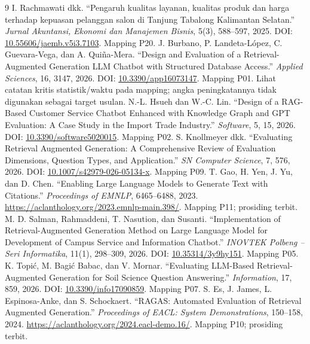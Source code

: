 \documentclass[11pt,a4paper]{article}
\begin{document}
\clearpage
\renewcommand{\refname}{Referensi Utama}
\begin{thebibliography}{9}
\setlength{\itemsep}{8pt}
 I. Rachmawati dkk. ``Pengaruh kualitas layanan, kualitas produk dan harga terhadap kepuasan pelanggan salon di Tanjung Tabalong Kalimantan Selatan.'' \textit{Jurnal Akuntansi, Ekonomi dan Manajemen Bisnis}, 5(3), 588--597, 2025. DOI: \href{https://doi.org/10.55606/jaemb.v5i3.7103}{10.55606/jaemb.v5i3.7103}. Mapping P20.
 J. Burbano, P. Landeta-L\'opez, C. Guevara-Vega, dan A. Qui\~na-Mera. ``Design and Evaluation of a Retrieval-Augmented Generation LLM Chatbot with Structured Database Access.'' \textit{Applied Sciences}, 16, 3147, 2026. DOI: \href{https://doi.org/10.3390/app16073147}{10.3390/app16073147}. Mapping P01. Lihat catatan kritis statistik/waktu pada mapping; angka peningkatannya tidak digunakan sebagai target usulan.
 N.-L. Hsueh dan W.-C. Lin. ``Design of a RAG-Based Customer Service Chatbot Enhanced with Knowledge Graph and GPT Evaluation: A Case Study in the Import Trade Industry.'' \textit{Software}, 5, 15, 2026. DOI: \href{https://doi.org/10.3390/software5020015}{10.3390/software5020015}. Mapping P02.
 S. Knollmeyer dkk. ``Evaluating Retrieval Augmented Generation: A Comprehensive Review of Evaluation Dimensions, Question Types, and Application.'' \textit{SN Computer Science}, 7, 576, 2026. DOI: \href{https://doi.org/10.1007/s42979-026-05134-x}{10.1007/s42979-026-05134-x}. Mapping P09.
 T. Gao, H. Yen, J. Yu, dan D. Chen. ``Enabling Large Language Models to Generate Text with Citations.'' \textit{Proceedings of EMNLP}, 6465--6488, 2023. \url{https://aclanthology.org/2023.emnlp-main.398/}. Mapping P11; prosiding terbit.
 M. D. Salman, Rahmaddeni, T. Nasution, dan Susanti. ``Implementation of Retrieval-Augmented Generation Method on Large Language Model for Development of Campus Service and Information Chatbot.'' \textit{INOVTEK Polbeng -- Seri Informatika}, 11(1), 298--309, 2026. DOI: \href{https://doi.org/10.35314/3y9hy151}{10.35314/3y9hy151}. Mapping P05.
 K. Topi\'c, M. Bagi\'c Babac, dan V. Mornar. ``Evaluating LLM-Based Retrieval-Augmented Generation for Soil Science Question Answering.'' \textit{Information}, 17, 859, 2026. DOI: \href{https://doi.org/10.3390/info17090859}{10.3390/info17090859}. Mapping P07.
 S. Es, J. James, L. Espinosa-Anke, dan S. Schockaert. ``RAGAS: Automated Evaluation of Retrieval Augmented Generation.'' \textit{Proceedings of EACL: System Demonstrations}, 150--158, 2024. \url{https://aclanthology.org/2024.eacl-demo.16/}. Mapping P10; prosiding terbit.
\end{thebibliography}
\end{document}
